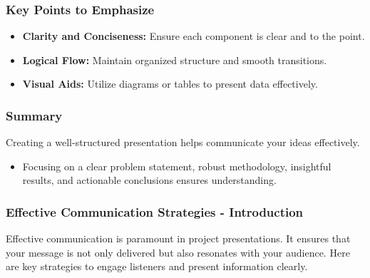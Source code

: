 \documentclass[aspectratio=169]{beamer}
\begin{document}
\begin{frame}[fragile]
    \frametitle{Key Points to Emphasize}
    \begin{itemize}
        \item \textbf{Clarity and Conciseness:} Ensure each component is clear and to the point.
        \item \textbf{Logical Flow:} Maintain organized structure and smooth transitions.
        \item \textbf{Visual Aids:} Utilize diagrams or tables to present data effectively.
    \end{itemize}
\end{frame}

\begin{frame}[fragile]
    \frametitle{Summary}
    Creating a well-structured presentation helps communicate your ideas effectively. 
    \begin{itemize}
        \item Focusing on a clear problem statement, robust methodology, insightful results, and actionable conclusions ensures understanding.
    \end{itemize}
\end{frame}

\begin{frame}[fragile]
    \frametitle{Effective Communication Strategies - Introduction}
    Effective communication is paramount in project presentations. 
    It ensures that your message is not only delivered but also resonates with your audience. Here are key strategies to engage listeners and present information clearly.
\end{frame}
\end{document}
